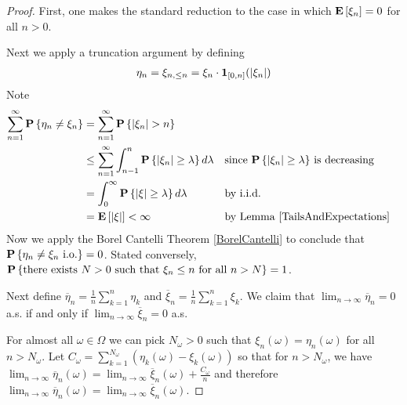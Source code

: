 \begin{proof}
First, one makes the standard reduction to the case in which
$\textbf{E}\left[\xi_n\right]= 0$ for all $n>0$.  

Next we apply a truncation argument by defining 
\begin{align*}
\eta_n = \xi_{n, \leq  n} = \xi_n \cdot \textbf{1}_{[0,n]}(\left \vert \xi_n \right \vert)
\end{align*}
Note
\begin{align*}
\sum_{n=1}^\infty \textbf{P}\left \{\eta_n \neq \xi_n \right \} &= \sum_{n=1}^\infty
\textbf{P}\left \{\left \vert \xi_n \right \vert > n \right \} \\
&\leq \sum_{n=1}^\infty \int_{n-1}^n
\textbf{P}\left \{\left \vert \xi_n \right \vert \geq \lambda  \right \} d\lambda & & \text{since
  $\textbf{P}\left \{\left \vert \xi_n \right \vert \geq \lambda \right \}$ is decreasing} \\
&= \int_0^\infty \textbf{P}\left \{\left \vert \xi \right \vert \geq \lambda  \right \} d\lambda & &
\text{by i.i.d. }\\
&= \textbf{E}\left[\left \vert \xi \right \vert\right] < \infty & & \text{by Lemma \ref{TailsAndExpectations}}
\end{align*}
Now we apply the Borel Cantelli Theorem \ref{BorelCantelli} to conclude that $\textbf{P}\left \{\eta_n \neq
  \xi_n \text{ i.o.} \right \} = 0$.  Stated conversely,
$\textbf{P}\left \{\text{there exists $N>0$ such that $\xi_n \leq n$ for
    all $n > N$} \right \} = 1$.

Next define $\overline{\eta}_n = \frac{1}{n}\sum_{k=1}^n \eta_k$ and
$\overline{\xi}_n = \frac{1}{n}\sum_{k=1}^n \xi_k$.  We claim that
$\lim_{n \to \infty} \overline{\eta}_n = 0$ a.s. if and only if
$\lim_{n \to \infty} \overline{\xi}_n = 0$ a.s.

For almost all $\omega \in \Omega$ we can pick
$N_\omega > 0$ such that $\xi_n(\omega) = \eta_n(\omega)$ for all $n >
N_\omega$.  Let $C_\omega = \sum_{k=1}^{N_\omega} \left (
  \eta_k(\omega) - \xi_k(\omega) \right )$ so that for $n > N_\omega$,
we have $\lim_{n \to \infty} \overline{\eta}_n(\omega) = \lim_{n \to \infty}
\overline{\xi}_n(\omega) + \frac{C_\omega}{n}$ and therefore $\lim_{n
  \to \infty} \overline{\eta}_n(\omega)  = \lim_{n \to \infty}
\overline{\xi}_n(\omega) $.  


\end{proof}
